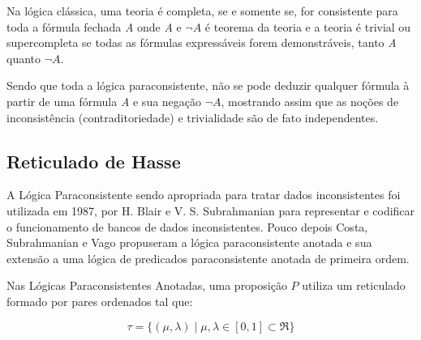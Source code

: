 Na lógica clássica, 
uma teoria é completa, 
se e somente se, for consistente para toda a fórmula fechada \emph{A} 
onde \emph{A} e \emph{$\neg A$} é teorema da teoria 
e a teoria é trivial ou supercompleta se todas as fórmulas expressáveis forem demonstráveis, 
tanto \emph{A} quanto \emph{$ \neg A$}.


Sendo que toda a lógica paraconsistente, 
não se pode deduzir qualquer fórmula à partir de uma fórmula \emph{A} e sua negação \emph{$\neg A$}, 
mostrando assim que as noções de inconsistência (contraditoriedade) e trivialidade são de fato independentes.







\subsection{Reticulado de Hasse}

A Lógica Paraconsistente sendo apropriada para tratar dados inconsistentes foi utilizada em 1987, 
por H. Blair e V. S. Subrahmanian para representar e codificar o funcionamento de bancos de dados inconsistentes. 
\cite{Abe1992} 
Pouco depois Costa, Subrahmanian e Vago propuseram a lógica paraconsistente anotada e sua extensão a uma lógica de predicados paraconsistente anotada de primeira ordem. 

Nas Lógicas Paraconsistentes Anotadas, uma proposição $P$ utiliza um reticulado formado por pares ordenados tal que: 

\begin{center}
\begin{equation}
\tau = \{ ( \mu , \lambda ) \mid \mu ,\lambda \in [0,1] \subset \Re \}
\end{equation}
\end{center}

